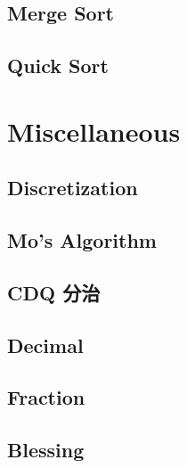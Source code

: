 \documentclass[a4paper,10pt,twocolumn,oneside]{article}
\newcommand{\inputcpp}[1]{}  %
\newcommand{\inputpy}[1]{}     %
\begin{document}
\subsection{Merge Sort}
\inputcpp{sort/merge_sort.cpp}

\subsection{Quick Sort}
\inputcpp{sort/quick_sort.cpp}


\section{Miscellaneous}


\subsection{Discretization}
\inputcpp{misc/discretization.cpp}

\subsection{Mo's Algorithm}
\inputcpp{misc/mos_algorithm.cpp}

\subsection{CDQ 分治}
\inputcpp{misc/cdq.cpp}

\subsection{Decimal}
\inputpy{misc/decimal.py}

\subsection{Fraction}
\inputpy{misc/fraction.py}

\subsection{Blessing}
\end{document}
